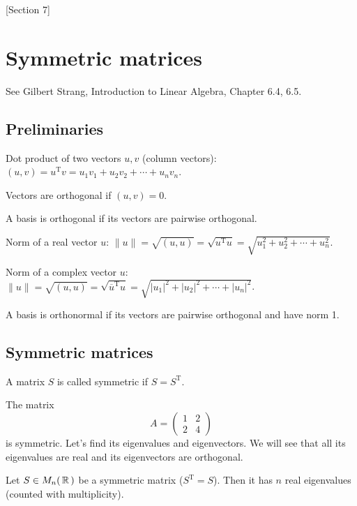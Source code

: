 [Section 7]

\newpage

\section{Symmetric matrices}

See Gilbert Strang, Introduction to Linear Algebra, Chapter 6.4, 6.5.

\subsection{Preliminaries}

Dot product of two vectors $u, v$ (column vectors): $(u, v) = u^{\mathrm T} v = u_1 v_1 + u_2 v_2 + \cdots + u_n v_n$.

Vectors are orthogonal if $(u, v) = 0$.

A basis is orthogonal if its vectors are pairwise orthogonal.

Norm of a real vector $u$: $\|u\| = \sqrt{(u, u)} = \sqrt{u^{\mathrm T} u} = \sqrt{u_1^2 + u_2^2 + \cdots + u_n^2}$.

Norm of a complex vector $u$: $\|u\| = \sqrt{(u, u)} = \sqrt{\overline{u}^{\mathrm T} u} = \sqrt{|u_1|^2 + |u_2|^2 + \cdots + |u_n|^2}$.

A basis is orthonormal if its vectors are pairwise orthogonal and have norm 1.

\subsection{Symmetric matrices}

\begin{definition}
A matrix $S$ is called symmetric if $S = S^{\mathrm T}$.
\end{definition}

\begin{example}
The matrix 
$$
A = \begin{pmatrix} 1 & 2\\ 2 & 4\end{pmatrix}
$$
is symmetric. Let's find its eigenvalues and eigenvectors. We will see that all its eigenvalues are real and its eigenvectors are orthogonal.
\end{example}

\begin{lemma}
Let $S\in M_n(\,\mathbb{R}\,)$ be a symmetric matrix ($S^{\mathrm T} = S$). Then it has $n$ real eigenvalues (counted with multiplicity).
\end{lemma}


